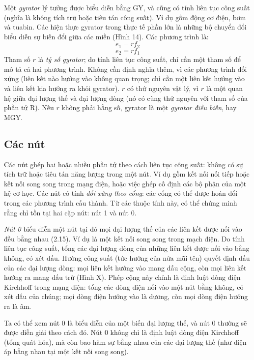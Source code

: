 Một \emph{gyrator} lý tưởng được biểu diễn bằng GY, và cũng có tính liên tục công suất (nghĩa là không tích trữ hoặc tiêu tán công suất). Ví dụ gồm động cơ điện, bơm và tuabin. Các hiện thực gyrator trong thực tế phần lớn là những bộ chuyển đổi biểu diễn sự biến đổi giữa các miền (Hình 14). Các phương trình là:
\begin{equation}e_1=rf_2\tag{2.5}\end{equation}
\begin{equation}e_2=rf_1\tag{2.6}\end{equation}
Tham số $r$ là \emph{tỷ số gyrator}; do tính liên tục công suất, chỉ cần một tham số để mô tả cả hai phương trình. Không cần định nghĩa thêm, vì các phương trình đối xứng (liên kết nào hướng vào không quan trọng; chỉ cần một liên kết hướng vào và liên kết kia hướng ra khỏi gyrator). $r$ có thứ nguyên vật lý, vì $r$ là một quan hệ giữa đại lượng thế và đại lượng dòng (nó có cùng thứ nguyên với tham số của phần tử R). Nếu $r$ không phải hằng số, gyrator là một \emph{gyrator điều biến}, hay MGY.

\subsection{Các nút}
Các nút ghép hai hoặc nhiều phần tử theo cách liên tục công suất: không có sự tích trữ hoặc tiêu tán năng lượng trong một nút. Ví dụ gồm kết nối nối tiếp hoặc kết nối song song trong mạng điện, hoặc việc ghép cố định các bộ phận của một hệ cơ học. Các nút có tính \emph{đối xứng theo cổng}: các cổng có thể được hoán đổi trong các phương trình cấu thành. Từ các thuộc tính này, có thể chứng minh rằng chỉ tồn tại hai cặp nút: nút 1 và nút 0.

\emph{Nút 0} biểu diễn một nút tại đó mọi đại lượng thế của các liên kết được nối vào đều bằng nhau (2.15). Ví dụ là một kết nối song song trong mạch điện. Do tính liên tục công suất, tổng các đại lượng dòng của những liên kết được nối vào bằng không, có xét dấu. Hướng công suất (tức hướng của nửa mũi tên) quyết định dấu của các đại lượng dòng: mọi liên kết hướng vào mang dấu cộng, còn mọi liên kết hướng ra mang dấu trừ (Hình X). Phép cộng này chính là định luật dòng điện Kirchhoff trong mạng điện: tổng các dòng điện nối vào một nút bằng không, có xét dấu của chúng; mọi dòng điện hướng vào là dương, còn mọi dòng điện hướng ra là âm.

Ta có thể xem nút 0 là biểu diễn của một biến đại lượng thế, và nút 0 thường sẽ được diễn giải theo cách đó. Nút 0 không chỉ là định luật dòng điện Kirchhoff (tổng quát hóa), mà còn bao hàm sự bằng nhau của các đại lượng thế (như điện áp bằng nhau tại một kết nối song song).

